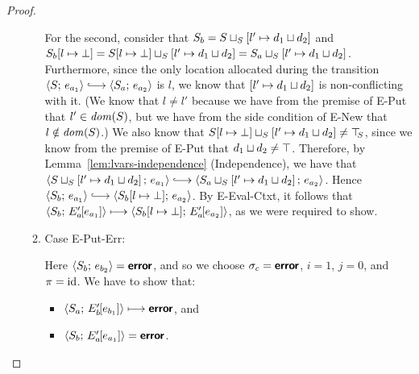\begin{proof}
\begin{enumerate}
\begin{enumerate}
      For the second, consider that $S_b =
      S \sqcup_{S} \left[ l' \mapsto d_1 \sqcup d_2 \right]$
      and $S_b[l \mapsto \bot] =
      S[l \mapsto \bot] \sqcup_{S} \left[ l' \mapsto d_1 \sqcup d_2 \right]
      =
      S_a \sqcup_{S} \left[ l' \mapsto d_1 \sqcup d_2 \right]$.
      Furthermore, since the only location allocated during the
      transition $\config{S}{e_{a_1}} \parstepsto
      \config{S_a}{e_{a_2}}$ is $l$, we know that
      $\left[ l' \mapsto d_1 \sqcup d_2 \right]$ is
      non-conflicting with it.  (We know that $l \neq l'$ because we
      have from the premise of {\sc E-Put} that $l' \in \mathit{dom}(S)$, but
      we have from the side condition of {\sc E-New} that $l \notin
      \mathit{dom}(S)$.)  We also know that
      $S[l \mapsto \bot] \sqcup_{S} \left[ l' \mapsto d_1 \sqcup d_2 \right]
      \neq \top\hspace{-0.85mm}_{S}$, since we know from the premise of {\sc E-Put} that
      $d_1 \sqcup d_2 \neq \top$.  Therefore, by
      Lemma~\ref{lem:lvars-independence} (Independence), we have that
      $\config{\lubstore{S}{\store{\storebindingRaw{l'}{\userlub{d_1}{d_2}}}}}{e_{a_1}}
      \parstepsto
      \config{\lubstore{S_a}{\store{\storebindingRaw{l'}{\userlub{d_1}{d_2}}}}}{e_{a_2}}$.
      Hence $\config{S_b}{e_{a_1}} \parstepsto
      \config{\extSRaw{S_b}{l}{\bot}}{e_{a_2}}$.  By {\sc
        E-Eval-Ctxt}, it follows that
      $\langle S_b;\, E'_a\hspace{-1mm}\left[e_{a_1}\right] \rangle \longmapsto
      \langle S_b[l \mapsto \bot];\, E'_a\hspace{-1mm}\left[e_{a_2}\right] \rangle$, as
      we were required to show.

    \item \label{lvars-slc-new-put-err}Case {\sc E-Put-Err}:

      Here $\langle S_b;\, e_{b_2} \rangle = \textbf{\textsf{error}}$, and so we choose $\sigma_c
      = \textbf{\textsf{error}}$, $i = 1$, $j = 0$, and $\pi = \mathrm{id}$.  We have to show
      that:
      \begin{itemize}
      \item $\langle S_a;\, E'_b\hspace{-1mm}\left[e_{b_1}\right] \rangle \longmapsto
        \textbf{\textsf{error}}$, and
      \item
        $\langle S_b;\, E'_a\hspace{-1mm}\left[e_{a_1}\right] \rangle = \textbf{\textsf{error}}$.
      \end{itemize}


\end{enumerate}
\end{enumerate}
\end{proof}
